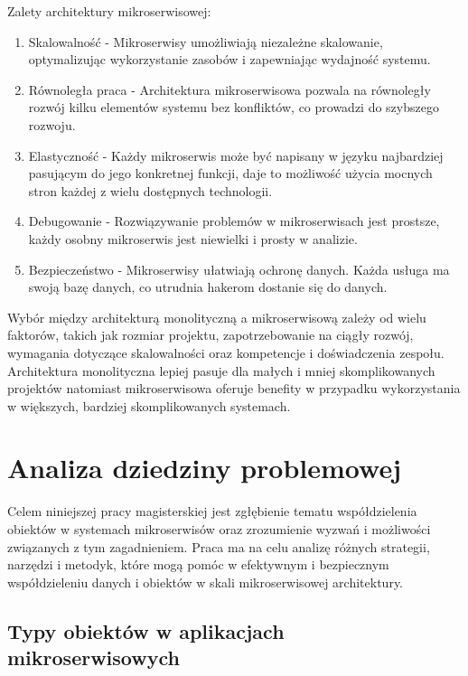 \documentclass[runningheads,12pt]{llncs}
\begin{document}
Zalety architektury mikroserwisowej:

\begin{enumerate}
    \item Skalowalność - Mikroserwisy umożliwiają niezależne skalowanie, optymalizując wykorzystanie zasobów i zapewniając wydajność systemu.
    \item Równoległa praca - Architektura mikroserwisowa pozwala na równoległy rozwój kilku elementów systemu bez konfliktów, co prowadzi do szybszego rozwoju.
    \item Elastyczność - Każdy mikroserwis może być napisany w języku najbardziej pasującym do jego konkretnej funkcji, daje to możliwość użycia mocnych stron każdej z wielu dostępnych technologii.
    \item Debugowanie - Rozwiązywanie problemów w mikroserwisach jest prostsze, każdy osobny mikroserwis jest niewielki i prosty w analizie.
    \item Bezpieczeństwo - Mikroserwisy ułatwiają ochronę danych. Każda usługa ma swoją bazę danych, co utrudnia hakerom dostanie się do danych.~\cite{sharma2023monolithic}
\end{enumerate}

Wybór między architekturą monolityczną a mikroserwisową zależy od wielu faktorów, takich jak rozmiar projektu, zapotrzebowanie na ciągły rozwój, wymagania dotyczące skalowalności oraz kompetencje i doświadczenia zespołu. Architektura monolityczna lepiej pasuje dla małych i mniej skomplikowanych projektów natomiast mikroserwisowa oferuje benefity w przypadku wykorzystania w większych, bardziej skomplikowanych systemach.

\newpage

\section{Analiza dziedziny problemowej}

Celem niniejszej pracy magisterskiej jest zgłębienie tematu współdzielenia obiektów w systemach mikroserwisów oraz zrozumienie wyzwań i możliwości związanych z tym zagadnieniem. Praca ma na celu analizę różnych strategii, narzędzi i metodyk, które mogą pomóc w efektywnym i bezpiecznym współdzieleniu danych i obiektów w skali mikroserwisowej architektury.

\subsection{Typy obiektów w aplikacjach mikroserwisowych}
\end{document}
